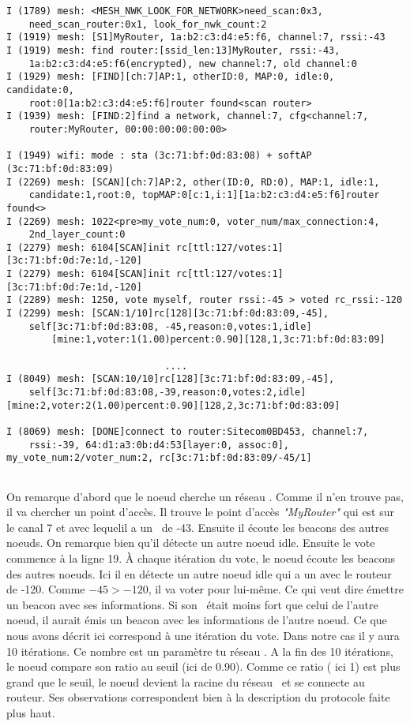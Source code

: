 \begin{enumerate}
\begin{verbatim}
I (1789) mesh: <MESH_NWK_LOOK_FOR_NETWORK>need_scan:0x3, 
    need_scan_router:0x1, look_for_nwk_count:2
I (1919) mesh: [S1]MyRouter, 1a:b2:c3:d4:e5:f6, channel:7, rssi:-43
I (1919) mesh: find router:[ssid_len:13]MyRouter, rssi:-43, 
    1a:b2:c3:d4:e5:f6(encrypted), new channel:7, old channel:0
I (1929) mesh: [FIND][ch:7]AP:1, otherID:0, MAP:0, idle:0, candidate:0, 
    root:0[1a:b2:c3:d4:e5:f6]router found<scan router>
I (1939) mesh: [FIND:2]find a network, channel:7, cfg<channel:7, 
    router:MyRouter, 00:00:00:00:00:00>

I (1949) wifi: mode : sta (3c:71:bf:0d:83:08) + softAP (3c:71:bf:0d:83:09)
I (2269) mesh: [SCAN][ch:7]AP:2, other(ID:0, RD:0), MAP:1, idle:1,
    candidate:1,root:0, topMAP:0[c:1,i:1][1a:b2:c3:d4:e5:f6]router found<>
I (2269) mesh: 1022<pre>my_vote_num:0, voter_num/max_connection:4,
    2nd_layer_count:0
I (2279) mesh: 6104[SCAN]init rc[ttl:127/votes:1][3c:71:bf:0d:7e:1d,-120]
I (2279) mesh: 6104[SCAN]init rc[ttl:127/votes:1][3c:71:bf:0d:7e:1d,-120]
I (2289) mesh: 1250, vote myself, router rssi:-45 > voted rc_rssi:-120
I (2299) mesh: [SCAN:1/10]rc[128][3c:71:bf:0d:83:09,-45], 
    self[3c:71:bf:0d:83:08, -45,reason:0,votes:1,idle]
        [mine:1,voter:1(1.00)percent:0.90][128,1,3c:71:bf:0d:83:09]

                            ....
I (8049) mesh: [SCAN:10/10]rc[128][3c:71:bf:0d:83:09,-45], 
    self[3c:71:bf:0d:83:08,-39,reason:0,votes:2,idle][mine:2,voter:2(1.00)percent:0.90][128,2,3c:71:bf:0d:83:09]

I (8069) mesh: [DONE]connect to router:Sitecom0BD453, channel:7,
    rssi:-39, 64:d1:a3:0b:d4:53[layer:0, assoc:0], my_vote_num:2/voter_num:2, rc[3c:71:bf:0d:83:09/-45/1]
                            

            \end{verbatim}
            On remarque d'abord que le noeud cherche un réseau \espmesh. Comme il n'en trouve pas,
            il va chercher un point d'accès. Il trouve le point d'accès \textit{"MyRouter"} qui est sur 
            le canal 7 et avec lequelil a un \rssi\ de -43. Ensuite il écoute les beacons
            des autres noeuds. On remarque bien qu'il détecte un autre noeud idle.
            Ensuite le vote commence à la ligne 19. À chaque itération du vote, le noeud
            écoute les beacons des autres noeuds. Ici il en détecte un autre noeud idle qui a un \rssi
            avec le routeur de -120. Comme $-45 > -120$, il va voter pour lui-même. Ce qui veut dire émettre
            un beacon avec ses informations. Si son \rssi\ était moins fort que celui de l'autre noeud, 
            il aurait émis un beacon avec les informations de l'autre noeud. Ce que nous avons décrit ici
            correspond à une itération du vote. Dans notre cas il y aura 10 itérations. Ce nombre est un paramètre
            tu réseau \espmesh. A la fin des 10 itérations, le noeud compare son ratio au seuil (ici de 0.90).
            Comme ce ratio ( ici 1) est plus grand que le seuil, le noeud devient la racine du réseau \espmesh\ et 
            se connecte au routeur.
            Ses observations correspondent bien à la description du protocole faite plus haut.


\end{enumerate}
